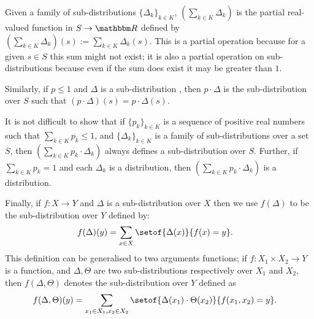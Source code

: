 \documentclass{LMCS}
\begin{document}
Given a family of sub-distributions $\{\Delta_k\}_{k \in K}$,
 $\left(\sum_{k \in K} \Delta_k\right)$ is the partial 
real-valued function in $S \rightarrow {\mathbbm R}$ defined by
$\left(\sum_{k \in K} \Delta_k\right)(s) \mathrel{:=} \sum_{k \in K} \Delta_k(s)$.
This is a partial operation because for a given $s \in S$ this sum  might not exist;
it is also a partial operation on sub-distributions because even if the sum does exist
it may be greater than $1$.

Similarly, if $p \leq 1$ and $\Delta$ is a sub-distribution , then $p\cdot\Delta$ is 
the sub-distribution over $S$ such that $(p\cdot\Delta)(s) = p \cdot \Delta(s)$.

It is not difficult to show that if $\{p_k\}_{k \in K}$ is a sequence 
of positive real numbers such that $\sum_{k \in K}p_k \leq 1$, 
and $\{\Delta_k\}_{k \in K}$ is a family of sub-distributions 
over a set $S$, then $\left(\sum_{k \in K} p_k \cdot \Delta_k\right)$ 
always defines a sub-distribution over $S$.
Further, if $\sum_{k \in K} p_k = 1$ and each $\Delta_k$ is a distribution, then 
$\left(\sum_{k \in K} p_k \cdot \Delta_k\right)$ is a distribution.

Finally, if $f:X \rightarrow Y$ and $\Delta$ is a sub-distribution
over $X$ then we use $f(\Delta)$ to be the sub-distribution over $Y$
defined by:
\begin{align}\label{eq:expected}
  &f(\Delta)(y) = \sum_{x \in X}\setof{\Delta(x)}{f(x)=y}.
\end{align}
This definition can be generalised to two arguments functions; if  
$f : X_1 \times X_2 \rightarrow Y$ is a function, 
and $\Delta, \Theta$ are two sub-distributions respectively 
over $X_1$ and $X_2$, then $f(\Delta, \Theta)$ denotes 
the sub-distribution over $Y$ defined as
\begin{align}\label{eq:twoargexpected}
  &f(\Delta, \Theta)(y) = \sum_{x_1 \in X_1, x_2 \in X_2}\setof{\Delta(x_1)\cdot\Theta(x_2)}{f(x_1,x_2)=y}.
\end{align}\vspace{2 pt}
\end{document}
